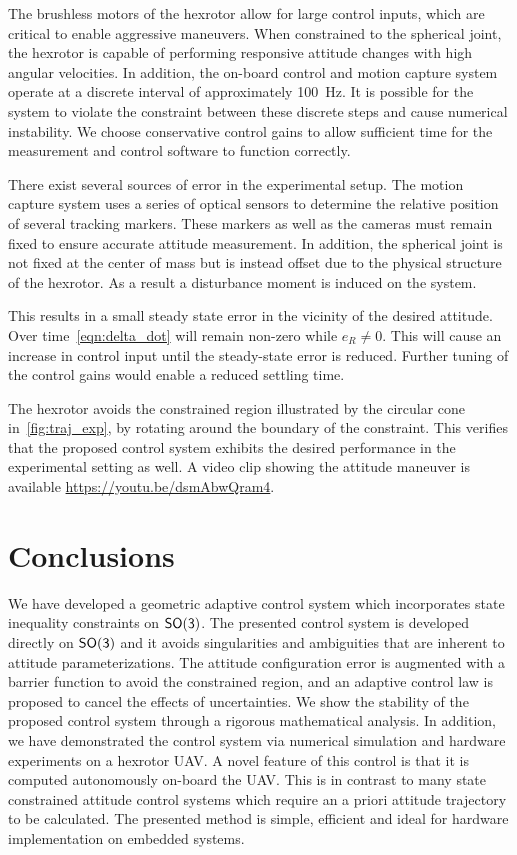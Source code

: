 \documentclass[letterpaper, 10 pt, conference]{ieeeconf}  %
\begin{document}
The brushless motors of the hexrotor allow for large control inputs, which are critical to enable aggressive maneuvers. 
When constrained to the spherical joint, the hexrotor is capable of performing responsive attitude changes with high angular velocities.
In addition, the on-board control and motion capture system operate at a discrete interval of approximately \SI{100}{\hertz}.
It is possible for the system to violate the constraint between these discrete steps and cause numerical instability.
We choose conservative control gains to  allow sufficient time for the measurement and control software to function correctly.

There exist several sources of error in the experimental setup.
The motion capture system uses a series of optical sensors to determine the relative position of several tracking markers. 
These markers as well as the cameras must remain fixed to ensure accurate attitude measurement.
In addition, the spherical joint is not fixed at the center of mass but is instead offset due to the physical structure of the hexrotor.
As a result a disturbance moment is induced on the system.

This results in a small steady state error in the vicinity of the desired attitude. 
Over time~\cref{eqn:delta_dot} will remain non-zero while \( e_R \neq 0 \).
This will cause an increase in control input until the steady-state error is reduced. 
Further tuning of the control gains would enable a reduced settling time.

The hexrotor avoids the constrained region illustrated by the circular cone in~\cref{fig:traj_exp}, by rotating around the boundary of the constraint. 
This verifies that the proposed control system exhibits the desired performance in the experimental setting as well. 
A video clip showing the attitude maneuver is available \url{https://youtu.be/dsmAbwQram4}.
\section{Conclusions}\label{sec:conclusions}
We have developed a geometric adaptive control system which incorporates state inequality constraints on \(\mathsf{SO(3)}\).
The presented control system is developed directly on \(\mathsf{SO(3)}\) and it avoids singularities and ambiguities that are inherent to attitude parameterizations.
The attitude configuration error is augmented with a barrier function to avoid the constrained region, and an adaptive control law is proposed to cancel the effects of uncertainties. 
We show the stability of the  proposed control system through a rigorous mathematical analysis.
In addition, we have demonstrated the control system via numerical simulation and hardware experiments on a hexrotor UAV.
A novel feature of this control is that it is computed autonomously on-board the UAV.
This is in contrast to many state constrained attitude control systems which require an a priori attitude trajectory to be calculated. 
The presented method is simple, efficient and ideal for hardware implementation on embedded systems.





\addtolength{\textheight}{-12cm}   
                                  


\end{document}
